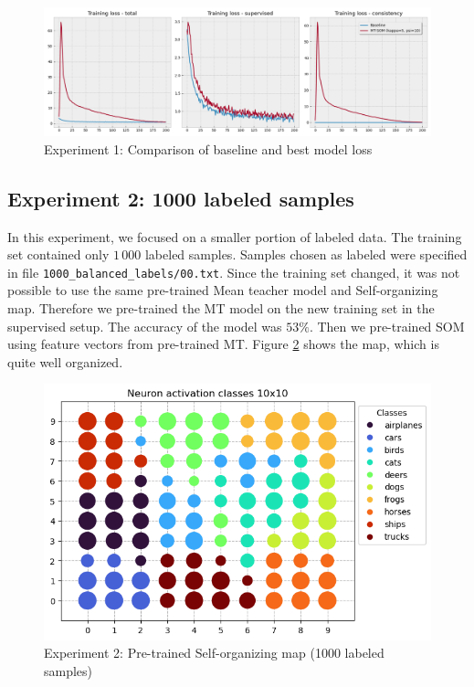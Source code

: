 \begin{figure}[h!]
    \centering
    \includegraphics[width=1\linewidth]{figs/fv-som-loss.png}
    \caption{Experiment 1: Comparison of baseline and best model loss}
    \label{exp1-loss}
\end{figure}

\subsection{Experiment 2: 1000 labeled samples}

In this experiment, we focused on a smaller portion of labeled data. The training set contained only $1\,000$ labeled samples. Samples chosen as labeled were specified in file \texttt{1000\_balanced\_labels/00.txt}. Since the training set changed, it was not possible to use the same pre-trained Mean teacher model and Self-organizing map. Therefore we pre-trained the MT model on the new training set in the supervised setup. The accuracy of the model was $53\%$. Then we pre-trained SOM using feature vectors from pre-trained MT. Figure \ref{exp2-som} shows the map, which is quite well organized.

\begin{figure}[h!]
    \centering
    \includegraphics[width=0.8\linewidth]{figs/fv-10n-79ep.png}
    \caption{Experiment 2: Pre-trained Self-organizing map (1000 labeled samples)}
    \label{exp2-som}
\end{figure}


